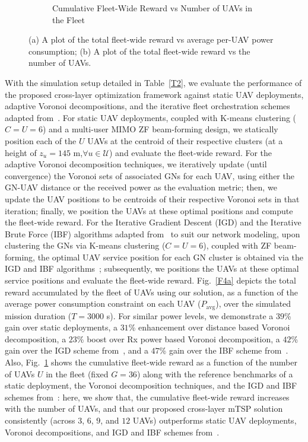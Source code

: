 \documentclass[10pt, twocolumn]{IEEEtran}
\begin{document}
\begin{figure}[t]
\begin{subfigure}{0.501\linewidth}
        \vspace{-1mm}
        \caption{Cumulative Fleet-Wide Reward vs Number of UAVs in the Fleet~\cite{Source_Code}}
        \label{F4b}
    \end{subfigure}
    \vspace{-5mm}
    \caption{(a) A plot of the total fleet-wide reward vs average per-UAV power consumption; (b) A plot of the total fleet-wide reward vs the number of UAVs.}
    \vspace{-7mm}
    \label{F4}
\end{figure}
With the simulation setup detailed in Table~\ref{T2}, we evaluate the performance of the proposed cross-layer optimization framework against static UAV deployments, adaptive Voronoi decompositions, and the iterative fleet orchestration schemes adapted from~\cite{CORES_ICASSP}. For static UAV deployments, coupled with K-means clustering ($C{=}U{=}6$) and a multi-user MIMO ZF beam-forming design, we statically position each of the $U$ UAVs at the centroid of their respective clusters (at a height of $z_{u}{=}145$ m,${\forall}u{\in}\mathcal{U}$) and evaluate the fleet-wide reward. For the adaptive Voronoi decomposition techniques, we iteratively update (until convergence) the Voronoi sets of associated GNs for each UAV, using either the GN-UAV distance or the received power as the evaluation metric; then, we update the UAV positions to be centroids of their respective Voronoi sets in that iteration; finally, we position the UAVs at these optimal positions and compute the fleet-wide reward. For the Iterative Gradient Descent (IGD) and the Iterative Brute Force (IBF) algorithms adapted from~\cite{CORES_ICASSP} to suit our network modeling, upon clustering the GNs via K-means clustering ($C{=}U{=}6$), coupled with ZF beam-forming, the optimal UAV service position for each GN cluster is obtained via the IGD and IBF algorithms~\cite{CORES_ICASSP}; subsequently, we positions the UAVs at these optimal service positions and evaluate the fleet-wide reward. Fig.~\ref{F4a} depicts the total reward accumulated by the fleet of UAVs using our solution, as a function of the average power consumption constraint on each UAV ($P_{\mathrm{avg}}$), over the simulated mission duration ($T{=}3000$ s). For similar power levels, we demonstrate a $39$\% gain over static deployments, a $31$\% enhancement over distance based Voronoi decomposition, a $23$\% boost over Rx power based Voronoi decomposition, a $42$\% gain over the IGD scheme from~\cite{CORES_ICASSP}, and a $47$\% gain over the IBF scheme from~\cite{CORES_ICASSP}. Also, Fig.~\ref{F4b} shows the cumulative fleet-wide reward as a function of the number of UAVs $U$ in the fleet (fixed $G{=}36$) along with the reference benchmarks of a static deployment, the Voronoi decomposition techniques, and the IGD and IBF schemes from~\cite{CORES_ICASSP}: here, we show that, the cumulative fleet-wide reward increases with the number of UAVs, and that our proposed cross-layer mTSP solution consistently (across $3$, $6$, $9$, and $12$ UAVs) outperforms static UAV deployments, Voronoi decompositions, and IGD and IBF schemes from~\cite{CORES_ICASSP}. 
\vspace{-6mm}
\end{document}

